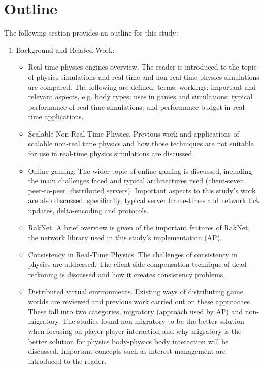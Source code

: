 \section{Outline}
The following section provides an outline for this study:
\begin{enumerate}
	
\item Background and Related Work:
\begin{itemize}
	\item Real-time physics engines overview. The reader is introduced to the topic of physics simulations and real-time and non-real-time physics simulations are compared. The following are defined: terms; workings; important and relevant aspects, e.g. body types; uses in games and simulations; typical performance of real-time simulations; and performance budget in real-time applications.
	\item Scalable Non-Real Time Physics. Previous work and applications of scalable non-real time physics and how those techniques are not suitable for use in real-time physics simulations are discussed.
	\item Online gaming. The wider topic of online gaming is discussed, including the main challenges faced and typical architectures used (client-sever, peer-to-peer, distributed servers). Important aspects to this study's work are also discussed, specifically, typical server frame-times and network tick updates, delta-encoding and protocols. 
	\item RakNet. A brief overview is given of the important features of RakNet, the network library used in this study's implementation (AP).
	\item Consistency in Real-Time Physics. The challenges of consistency in physics are addressed. The client-side compensation technique of dead-reckoning is discussed and how it creates consistency problems.
	\item Distributed virtual environments. Existing ways of distributing game worlds are reviewed and previous work carried out on these approaches. These fall into two categories, migratory (approach used by AP) and non-migratory. The studies found non-migratory to be the better solution when focusing on player-player interaction and why migratory is the better solution for physics body-physics body interaction will be discussed. Important concepts such as interest management are introduced to the reader.

\end{itemize}
\end{enumerate}
